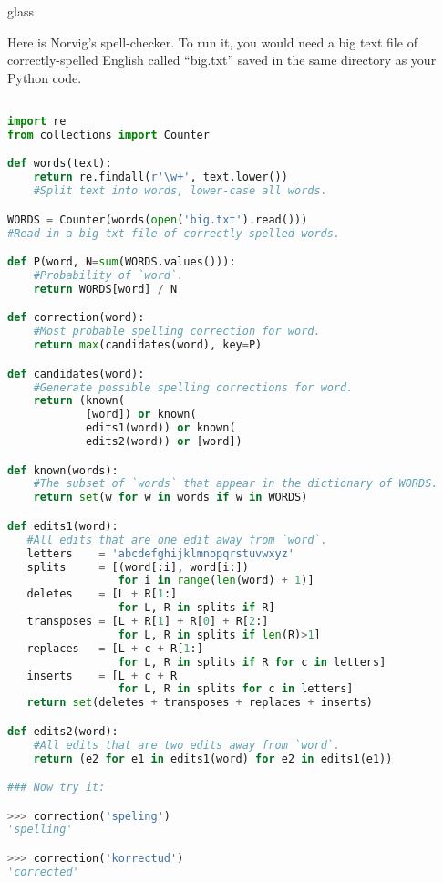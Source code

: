 \begin{tblsfilledsymbol}{}{glass}
\begin{underthehood}

Here is Norvig's spell-checker.  To run it, you would need a big text file of correctly-spelled English called ``big.txt'' saved in the same directory as your Python code.

\begin{lstlisting}[language=Python]

import re
from collections import Counter

def words(text): 
    return re.findall(r'\w+', text.lower())
    #Split text into words, lower-case all words.

WORDS = Counter(words(open('big.txt').read()))
#Read in a big txt file of correctly-spelled words.

def P(word, N=sum(WORDS.values())): 
    #Probability of `word`.
    return WORDS[word] / N

def correction(word): 
    #Most probable spelling correction for word.
    return max(candidates(word), key=P)

def candidates(word): 
    #Generate possible spelling corrections for word.
    return (known(
            [word]) or known(
            edits1(word)) or known(
            edits2(word)) or [word])

def known(words): 
    #The subset of `words` that appear in the dictionary of WORDS.
    return set(w for w in words if w in WORDS)

def edits1(word):
   #All edits that are one edit away from `word`.
   letters    = 'abcdefghijklmnopqrstuvwxyz'
   splits     = [(word[:i], word[i:])  
                 for i in range(len(word) + 1)]
   deletes    = [L + R[1:]             
                 for L, R in splits if R]
   transposes = [L + R[1] + R[0] + R[2:] 
                 for L, R in splits if len(R)>1]
   replaces   = [L + c + R[1:]  
                 for L, R in splits if R for c in letters]
   inserts    = [L + c + R               
                 for L, R in splits for c in letters]
   return set(deletes + transposes + replaces + inserts)

def edits2(word): 
    #All edits that are two edits away from `word`.
    return (e2 for e1 in edits1(word) for e2 in edits1(e1))

### Now try it:

>>> correction('speling')
'spelling'

>>> correction('korrectud')
'corrected'

\end{lstlisting}
\end{underthehood}
\end{tblsfilledsymbol}


